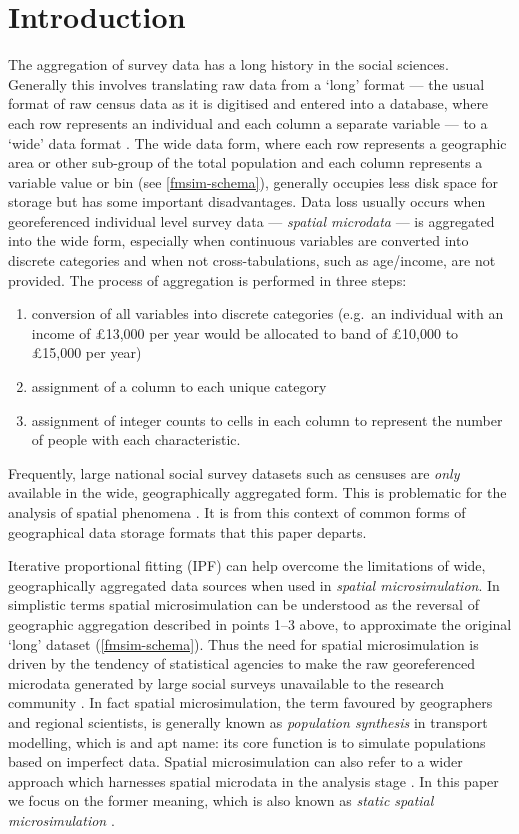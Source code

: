 \documentclass[a4paper,10pt]{article}
\begin{document}
\section{Introduction}
The aggregation of survey data has a long history in the social sciences. 
Generally this involves translating raw data from a `long' format
--- the usual format of raw census data as it is digitised and entered into a database,
where each row represents an individual and each column a separate variable ---
to a `wide' data format \citep[Chapter 9]{van2012flexible}. The wide data form,
where each row represents a geographic area or other sub-group of
the total population and each column represents a variable value or bin (see \cref{fmsim-schema}), 
generally occupies less disk space for storage but has some important disadvantages. 
Data loss usually occurs when georeferenced individual level survey data
--- \emph{spatial microdata} --- is aggregated into the wide form,
especially when continuous variables are converted into discrete categories and 
when not cross-tabulations, such as age/income, are not provided.
The process of aggregation is performed in three steps:
\begin{enumerate}
 \item conversion of all
variables into discrete categories (e.g.~an individual with an income of £13,000 per year
would be allocated to band of £10,000 to £15,000 per year)
 \item assignment of a column to each unique category
 \item assignment of
integer counts to cells in each column to represent the number of people with each characteristic.
\end{enumerate}
Frequently, large national social survey datasets 
such as censuses are \emph{only} available in the wide, geographically aggregated
form. This is problematic for the analysis of spatial phenomena \citep{Openshaw1984,Lee2009}.
It is from this context of common forms of geographical data storage formats that this paper departs.

Iterative proportional fitting (IPF) can help overcome the limitations of wide, geographically aggregated data
sources when used in
\emph{spatial microsimulation}. In simplistic terms spatial microsimulation can be understood
as the reversal of geographic aggregation described in points 1--3 above,
to approximate the original `long' dataset (\cref{fmsim-schema}).
Thus the need for spatial microsimulation is driven by
the tendency of statistical agencies to make the raw georeferenced microdata generated 
by large social surveys unavailable to the research community \citep{Lee2009}.
In fact spatial microsimulation, the term favoured by geographers and regional scientists, is
generally known as \emph{population synthesis} in transport modelling, which 
is and apt name: its core function is to simulate populations based on 
imperfect data. Spatial microsimulation can also refer to a wider approach which
harnesses spatial microdata in the analysis stage \citep{Holm1987, Lovelace2014-jtg}.
In this paper we focus on the former meaning, which is also known as \emph{static spatial microsimulation}
\citep{Ballas2005c}.
\end{document}
